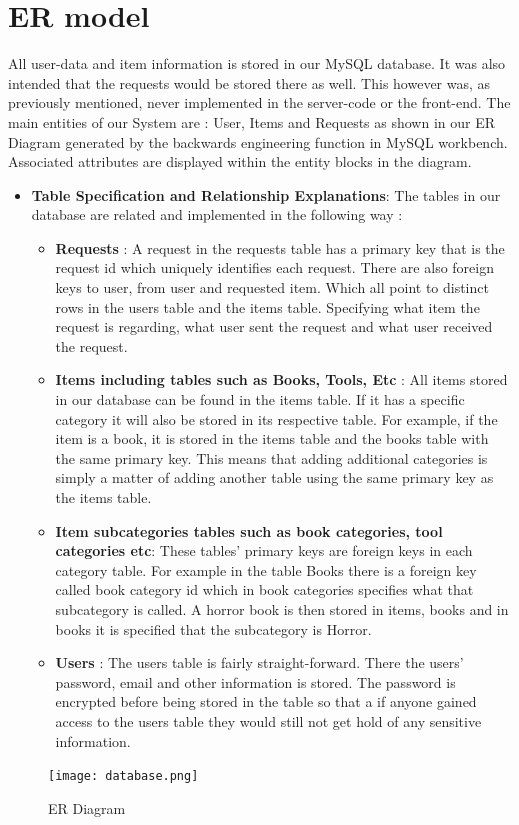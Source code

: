 \documentclass[a4paper]{article}
\begin{document}
\section{ER model} All user-data and item information is stored in our MySQL database. It was also intended that the requests would be stored there as well. This however was, as previously mentioned, never implemented in the server-code or the front-end. The main entities of our System are : User, Items and Requests as shown in our ER Diagram generated by the backwards engineering function in MySQL workbench. Associated attributes are displayed within the entity blocks in the diagram.
\begin{itemize}
\item \textbf{Table Specification and Relationship Explanations}: The tables in our database are related and implemented in the following way : 
\begin{itemize}
\item \textbf{Requests} : A request in the requests table has a primary key that is the request id which uniquely identifies each request. There are also foreign keys to user, from user and requested item. Which all point to distinct rows in the users table and the items table. Specifying what item the request is regarding, what user sent the request and what user received the request.
\item \textbf{Items including tables such as Books, Tools, Etc} : All items stored in our database can be found in the items table. If it has a specific category it will also be stored in its respective table. For example, if the item is a book, it is stored in the items table and the books table with the same primary key. This means that adding additional categories is simply a matter of adding another table using the same primary key as the items table.
\item \textbf{Item subcategories tables such as book categories, tool categories etc}: These tables' primary keys are foreign keys in each category table. For example in the table Books there is a foreign key called book category id which in book categories specifies what that subcategory is called. A horror book is then stored in items, books and in books it is specified that the subcategory is Horror.
\item \textbf{Users} : The users table is fairly straight-forward. There the users' password, email and other information is stored. The password is encrypted before being stored in the table so that a if anyone gained access to the users table they would still not get hold of any sensitive information.
\end{itemize}

\end{itemize}
\begin{figure}[H] 
  \centering
  \texttt{[image: database.png]}\hfill
  \caption{ER Diagram}\label{ERDiagram}
\end{figure}
\end{document}
